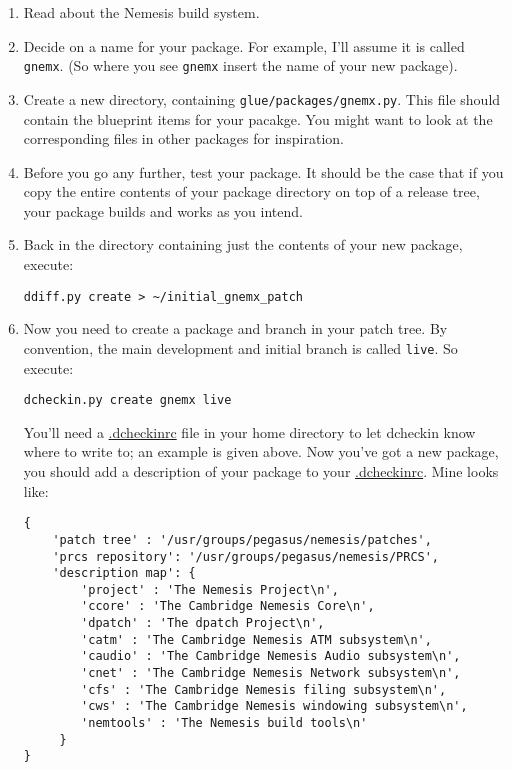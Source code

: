 \documentclass[a4paper]{article}
\newcommand{\file}[1]{\url{#1}}
\begin{document}
\begin{enumerate}
\item Read about the Nemesis build system.
  
\item Decide on a name for your package. For example, I'll assume it
  is called \texttt{gnemx}. (So where you see \texttt{gnemx} insert
  the name of your new package).
  
\item Create a new directory, containing
  \texttt{glue/packages/gnemx.py}. This file should contain the
  blueprint items for your pacakge. You might want to look at the
  corresponding files in other packages for inspiration.
  
\item Before you go any further, test your package. It should be the
  case that if you copy the entire contents of your package directory
  on top of a release tree, your package builds and works as you
  intend.
  
\item Back in the directory containing just the contents of your new
  package, execute:

\begin{verbatim}
ddiff.py create > ~/initial_gnemx_patch
\end{verbatim}
  
\item Now you need to create a package and branch in your patch tree.
  By convention, the main development and initial branch is called
  \texttt{live}. So execute:

\begin{verbatim}
dcheckin.py create gnemx live
\end{verbatim}

You'll need a \file{.dcheckinrc} file in your home directory to let
dcheckin know where to write to; an example is given above. Now you've
got a new package, you should add a description of your package to
your \file{.dcheckinrc}. Mine looks like:

\begin{verbatim}
{
    'patch tree' : '/usr/groups/pegasus/nemesis/patches',
    'prcs repository': '/usr/groups/pegasus/nemesis/PRCS',
    'description map': {
        'project' : 'The Nemesis Project\n',
        'ccore' : 'The Cambridge Nemesis Core\n',
        'dpatch' : 'The dpatch Project\n',
        'catm' : 'The Cambridge Nemesis ATM subsystem\n',
        'caudio' : 'The Cambridge Nemesis Audio subsystem\n',
        'cnet' : 'The Cambridge Nemesis Network subsystem\n',
        'cfs' : 'The Cambridge Nemesis filing subsystem\n',
        'cws' : 'The Cambridge Nemesis windowing subsystem\n',
        'nemtools' : 'The Nemesis build tools\n'
     }
}
\end{verbatim}


\end{enumerate}
\end{document}

